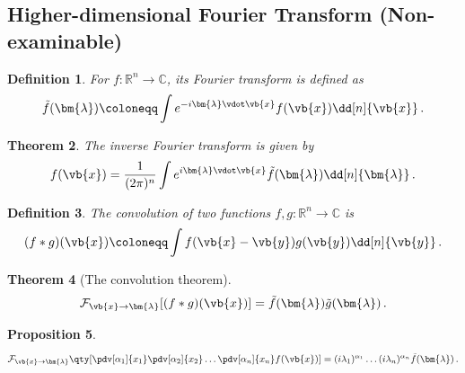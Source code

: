 \documentclass{article}
\theoremstyle{plain}\theoremheaderfont{\normalfont\itshape}\theorembodyfont{\rmfamily}\theoremseparator{.}\newtheorem*{rem}{Remark}\newtheorem*{ex}{Example}\newtheorem*{proof}{Proof}\newtheorem*{altp}{Alternative proof}
\theoremstyle{plain}\theoremheaderfont{\normalfont\bfseries}\theorembodyfont{\rmfamily}\theoremseparator{.}\newtheorem{thm}{Theorem}[section]\newtheorem{lem}[thm]{Lemma}\newtheorem{prop}[thm]{Proposition}\newtheorem*{cor}{Corollary}\newtheorem{defn}[thm]{Definition}\newtheorem{clm}[thm]{Claim}\newtheorem{clminproof}{Claim}
\theoremstyle{break}\theoremheaderfont{\normalfont\itshape}\theorembodyfont{\rmfamily}\theoremseparator{.\medskip}\newtheorem*{proofskip}{Proof}\newtheorem*{exs}{Examples}\newtheorem*{rems}{Remarks}
\theoremstyle{break}\theoremheaderfont{\normalfont\bfseries}\theorembodyfont{\rmfamily}\theoremseparator{.\medskip}\newtheorem{lemskip}[thm]{Lemma}\newtheorem{defnskip}[thm]{Definition}\newtheorem{propskip}[thm]{Proposition}\newtheorem{thmskip}[thm]{Theorem}
\numberwithin{equation}{section}
\newcommand{\bl}{\bm{\lambda}}
\begin{document}
	\subsection{Higher-dimensional Fourier Transform (Non-examinable)}
	\begin{defn}
		For \(f:\mathbb{R}^n\to\mathbb{C}\), its \textit{Fourier transform} is defined as
		\[\tilde{f}(\bl)\coloneqq\int e^{-i\bl\vdot\vb{x}}f(\vb{x})\dd[n]{\vb{x}}\,.\]
	\end{defn}
	\begin{thm}
		The \textit{inverse Fourier transform} is given by
		\[f(\vb{x})=\frac{1}{(2\pi)^n}\int e^{i\bl\vdot\vb{x}}\tilde{f}(\bl)\dd[n]{\bl}\,.\]
	\end{thm}
	\begin{defn}
		The convolution of two functions \(f,g:\mathbb{R}^n\to\mathbb{C}\) is
		\[(f*g)(\vb{x})\coloneqq\int f(\vb{x}-\vb{y})g(\vb{y})\dd[n]{\vb{y}}\,.\]
	\end{defn}
	\begin{thm}[The convolution theorem]
		\[\mathcal{F}_{\vb{x}\to\bl}[(f*g)(\vb{x})]=\tilde{f}(\bl)\tilde{g}(\bl)\,.\]
	\end{thm}
	\begin{prop}
		\[\mathcal{F}_{\vb{x}\to\bl}\qty[\pdv[\alpha_1]{x_1}\pdv[\alpha_2]{x_2}\dots\pdv[\alpha_n]{x_n} f(\vb{x})]=(i\lambda_1)^{\alpha_1}\dots(i\lambda_n)^{\alpha_n}\tilde{f}(\bl)\,.\]
	\end{prop}
\end{document}
